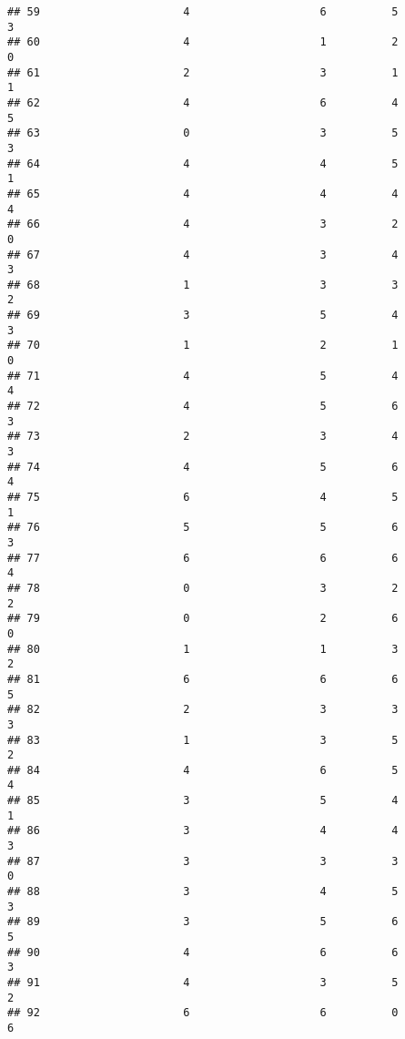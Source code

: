 \documentclass[
]{article}
\begin{document}
\begin{verbatim}
## 59                      4                    6          5               3
## 60                      4                    1          2               0
## 61                      2                    3          1               1
## 62                      4                    6          4               5
## 63                      0                    3          5               3
## 64                      4                    4          5               1
## 65                      4                    4          4               4
## 66                      4                    3          2               0
## 67                      4                    3          4               3
## 68                      1                    3          3               2
## 69                      3                    5          4               3
## 70                      1                    2          1               0
## 71                      4                    5          4               4
## 72                      4                    5          6               3
## 73                      2                    3          4               3
## 74                      4                    5          6               4
## 75                      6                    4          5               1
## 76                      5                    5          6               3
## 77                      6                    6          6               4
## 78                      0                    3          2               2
## 79                      0                    2          6               0
## 80                      1                    1          3               2
## 81                      6                    6          6               5
## 82                      2                    3          3               3
## 83                      1                    3          5               2
## 84                      4                    6          5               4
## 85                      3                    5          4               1
## 86                      3                    4          4               3
## 87                      3                    3          3               0
## 88                      3                    4          5               3
## 89                      3                    5          6               5
## 90                      4                    6          6               3
## 91                      4                    3          5               2
## 92                      6                    6          0               6

\end{verbatim}
\end{document}
